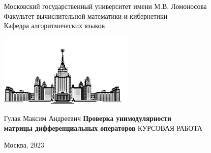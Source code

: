 \thispagestyle{empty}
\begin{center}  
	Московский государственный университет имени М.В. Ломоносова\\
	Факультет вычислительной математики и кибернетики\\
	Кафедра алгоритмических языков
\end{center}

\begin{center}
	\includegraphics[width=0.5\textwidth]{msu.pdf}
\end{center}

\begin{center}
	\vfill
	\large{Гулак Максим Андреевич}
	\vfill
	\large{\textbf{Проверка унимодулярности \\матрицы дифференциальных операторов}}
	\vfill
	\large{КУРСОВАЯ РАБОТА}
	\vfill
\end{center}
\vfill
\hfill
\begin{minipage}{1.0\textwidth}
\end{minipage}
\vfill
\begin{center}
	\large{Москва, 2023}
\end{center}
\kern-2cm
